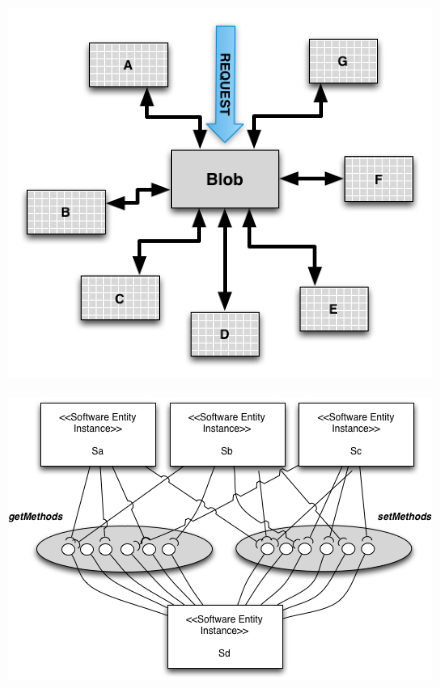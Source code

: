 \documentclass[espaco=umemeio,chapter=TITLE,twoside,openright]{abnt}
\begin{document}
\begin{figure}[h]
\begin{minipage}{.5\textwidth}
\centering
\includegraphics[width=1\textwidth]{./images/BLOB.png}
\label{fig:godclass}
\end{minipage}
\begin{minipage}{.5\textwidth}
\centering
\includegraphics[width=1\textwidth]{./images/blob2.png}
\label{fig:godclass2}
\end{minipage}
\end{figure}
\end{document}
